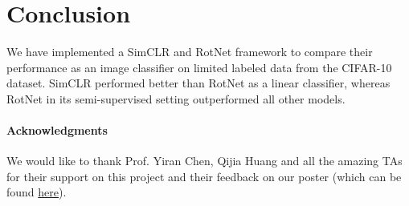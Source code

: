 \section{Conclusion}
\label{conc}

We have implemented a SimCLR and RotNet framework to compare their performance as an image classifier on limited labeled data from the CIFAR-10 dataset. SimCLR performed better than RotNet as a linear classifier, whereas RotNet in its semi-supervised setting outperformed all other models.

\paragraph{Acknowledgments} We would like to thank Prof. Yiran Chen, Qijia Huang and all the amazing TAs for their support on this project and their feedback on our poster (which can be found \href{https://github.com/dai-anna/SemiSupervisedBenchmarking/tree/main/poster}{here}).


